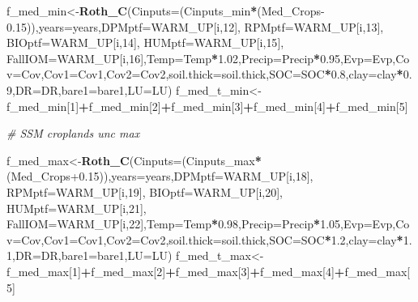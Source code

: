 \documentclass[
  10pt,
  b5paper,
]{book}
\newenvironment{Shaded}{\begin{snugshade}}{\end{snugshade}}
\newcommand{\CommentTok}[1]{\textcolor[rgb]{0.56,0.35,0.01}{\textit{#1}}}
\newcommand{\DataTypeTok}[1]{\textcolor[rgb]{0.13,0.29,0.53}{#1}}
\newcommand{\DecValTok}[1]{\textcolor[rgb]{0.00,0.00,0.81}{#1}}
\newcommand{\FloatTok}[1]{\textcolor[rgb]{0.00,0.00,0.81}{#1}}
\newcommand{\KeywordTok}[1]{\textcolor[rgb]{0.13,0.29,0.53}{\textbf{#1}}}
\newcommand{\NormalTok}[1]{#1}
\newcommand{\OperatorTok}[1]{\textcolor[rgb]{0.81,0.36,0.00}{\textbf{#1}}}
\begin{document}
\begin{Shaded}
\begin{Highlighting}[]
{\NormalTok{f_med_min<-}\KeywordTok{Roth_C}\NormalTok{(}\DataTypeTok{Cinputs=}\NormalTok{(Cinputs_min}\OperatorTok{*}\NormalTok{(Med_Crops}\FloatTok{-0.15}\NormalTok{)),}\DataTypeTok{years=}\NormalTok{years,}\DataTypeTok{DPMptf=}\NormalTok{WARM_UP[i,}\DecValTok{12}\NormalTok{], }\DataTypeTok{RPMptf=}\NormalTok{WARM_UP[i,}\DecValTok{13}\NormalTok{], }\DataTypeTok{BIOptf=}\NormalTok{WARM_UP[i,}\DecValTok{14}\NormalTok{], }\DataTypeTok{HUMptf=}\NormalTok{WARM_UP[i,}\DecValTok{15}\NormalTok{], }\DataTypeTok{FallIOM=}\NormalTok{WARM_UP[i,}\DecValTok{16}\NormalTok{],}\DataTypeTok{Temp=}\NormalTok{Temp}\OperatorTok{*}\FloatTok{1.02}\NormalTok{,}\DataTypeTok{Precip=}\NormalTok{Precip}\OperatorTok{*}\FloatTok{0.95}\NormalTok{,}\DataTypeTok{Evp=}\NormalTok{Evp,}\DataTypeTok{Cov=}\NormalTok{Cov,}\DataTypeTok{Cov1=}\NormalTok{Cov1,}\DataTypeTok{Cov2=}\NormalTok{Cov2,}\DataTypeTok{soil.thick=}\NormalTok{soil.thick,}\DataTypeTok{SOC=}\NormalTok{SOC}\OperatorTok{*}\FloatTok{0.8}\NormalTok{,}\DataTypeTok{clay=}\NormalTok{clay}\OperatorTok{*}\FloatTok{0.9}\NormalTok{,}\DataTypeTok{DR=}\NormalTok{DR,}\DataTypeTok{bare1=}\NormalTok{bare1,}\DataTypeTok{LU=}\NormalTok{LU)}
\NormalTok{f_med_t_min<-f_med_min[}\DecValTok{1}\NormalTok{]}\OperatorTok{+}\NormalTok{f_med_min[}\DecValTok{2}\NormalTok{]}\OperatorTok{+}\NormalTok{f_med_min[}\DecValTok{3}\NormalTok{]}\OperatorTok{+}\NormalTok{f_med_min[}\DecValTok{4}\NormalTok{]}\OperatorTok{+}\NormalTok{f_med_min[}\DecValTok{5}\NormalTok{]}

\CommentTok{# SSM croplands unc max}

\NormalTok{f_med_max<-}\KeywordTok{Roth_C}\NormalTok{(}\DataTypeTok{Cinputs=}\NormalTok{(Cinputs_max}\OperatorTok{*}\NormalTok{(Med_Crops}\FloatTok{+0.15}\NormalTok{)),}\DataTypeTok{years=}\NormalTok{years,}\DataTypeTok{DPMptf=}\NormalTok{WARM_UP[i,}\DecValTok{18}\NormalTok{], }\DataTypeTok{RPMptf=}\NormalTok{WARM_UP[i,}\DecValTok{19}\NormalTok{], }\DataTypeTok{BIOptf=}\NormalTok{WARM_UP[i,}\DecValTok{20}\NormalTok{], }\DataTypeTok{HUMptf=}\NormalTok{WARM_UP[i,}\DecValTok{21}\NormalTok{], }\DataTypeTok{FallIOM=}\NormalTok{WARM_UP[i,}\DecValTok{22}\NormalTok{],}\DataTypeTok{Temp=}\NormalTok{Temp}\OperatorTok{*}\FloatTok{0.98}\NormalTok{,}\DataTypeTok{Precip=}\NormalTok{Precip}\OperatorTok{*}\FloatTok{1.05}\NormalTok{,}\DataTypeTok{Evp=}\NormalTok{Evp,}\DataTypeTok{Cov=}\NormalTok{Cov,}\DataTypeTok{Cov1=}\NormalTok{Cov1,}\DataTypeTok{Cov2=}\NormalTok{Cov2,}\DataTypeTok{soil.thick=}\NormalTok{soil.thick,}\DataTypeTok{SOC=}\NormalTok{SOC}\OperatorTok{*}\FloatTok{1.2}\NormalTok{,}\DataTypeTok{clay=}\NormalTok{clay}\OperatorTok{*}\FloatTok{1.1}\NormalTok{,}\DataTypeTok{DR=}\NormalTok{DR,}\DataTypeTok{bare1=}\NormalTok{bare1,}\DataTypeTok{LU=}\NormalTok{LU)}
\NormalTok{f_med_t_max<-f_med_max[}\DecValTok{1}\NormalTok{]}\OperatorTok{+}\NormalTok{f_med_max[}\DecValTok{2}\NormalTok{]}\OperatorTok{+}\NormalTok{f_med_max[}\DecValTok{3}\NormalTok{]}\OperatorTok{+}\NormalTok{f_med_max[}\DecValTok{4}\NormalTok{]}\OperatorTok{+}\NormalTok{f_med_max[}\DecValTok{5}\NormalTok{]}

}
\end{Highlighting}
\end{Shaded}
\end{document}
